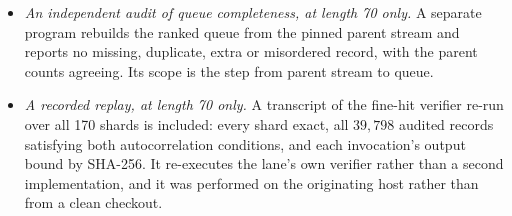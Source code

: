 \documentclass[11pt]{article}
\begin{document}
\begin{itemize}
  ancestor of all twelve commits that introduced an interval audit.  This is
  repository-level chronology, not an externally attested clock: commit
  timestamps are settable by whoever makes the commit, and a history of this
  shape could be constructed after the fact by someone intending to.  We claim
  only what it is --- a declaration of scope that precedes the results in the
  recorded history --- and we claim it for length 70 alone.  That history is
  the private working repository's: the release ships the declaration and the
  audits it binds, not the repository objects, so the reader has our report of
  the ancestry check rather than the means to re-run it.
  \item \emph{An independent audit of queue completeness, at length 70 only.}
  A separate program rebuilds the ranked queue from the pinned parent stream
  and reports no missing, duplicate, extra or misordered record, with the
  parent counts agreeing.  Its scope is the step from parent stream to queue.
  \item \emph{A recorded replay, at length 70 only.} A transcript of the
  fine-hit verifier re-run over all 170 shards is included: every shard exact,
  all $39{,}798$ audited records satisfying both autocorrelation conditions,
  and each invocation's output bound by SHA-256.  It re-executes the lane's own
  verifier rather than a second implementation, and it was performed on the
  originating host rather than from a clean checkout.
\end{itemize}
\end{document}
